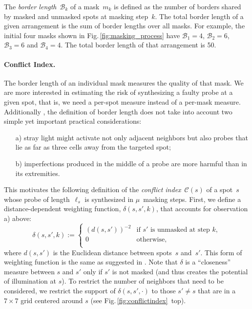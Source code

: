 \documentclass{llncs}
\begin{document}
The \emph{border length}~$\mathcal{B}_k$ of a mask~$m_{k}$ is defined as the
number of borders shared by masked and unmasked spots at masking step~$k$. The
total border length of a given arrangement is the sum of border lengths over
all masks. For example, the initial four masks shown in
Fig.\,\ref{fig:masking_process} have $\mathcal{B}_1 = 4$, $\mathcal{B}_2 = 6$,
$\mathcal{B}_3 = 6$ and $\mathcal{B}_4 = 4$.  The total border length of that
arrangement is 50.



\paragraph{Conflict Index.}
The border length of an individual mask measures the quality of that
mask. We are more interested in estimating the risk of synthesizing a faulty
probe at a given spot, that is, we need a per-spot measure
instead of a per-mask measure. Additionally \cite{KAHNG03A},
the definition of border length does not take into account two
simple yet important practical considerations:
\begin{itemize}
\item[a)] stray light might activate not only adjacent neighbors but
  also probes that lie as far as three cells away from the targeted
  spot;
\item[b)] imperfections produced in the middle of a probe are more
  harmful than in its extremities.
\end{itemize}
This motivates the following definition of the \emph{conflict
  index}~$\mathcal{C}(s)$ of a spot~$s$ whose probe of
length~$\ell_{s}$ is synthesized in $\mu$~masking steps. First, we
define a distance-dependent weighting function, $\delta(s,s',k)$, that
accounts for observation a) above:
\begin{equation}
\label{eq:dist_weight}
\delta(s,s',k) :=
        \left\{
                \begin{array}{ll}
                        (d(s,s'))^{-2} & \mbox{if $s'$ is unmasked at step $k$}, \\
                        0 & \mbox{otherwise}, \\
                \end{array}
        \right.
\end{equation}
where $d(s,s')$ is the Euclidean distance between spots~$s$ and~$s'$.
This form of weighting function is the same as suggested in
\cite{KAHNG03A}.  Note that $\delta$ is a ``closeness'' measure
between $s$ and $s'$ only if $s'$ is
not masked (and thus creates the potential of illumination at $s$). To
restrict the number of neighbors that need to be considered, we
restrict the support of $\delta(s,s',\cdot)$ to those $s'\neq s$ that
are in a $7\times 7$ grid centered around $s$ (see
Fig.\,\ref{fig:conflictindex}~top).
\end{document}
